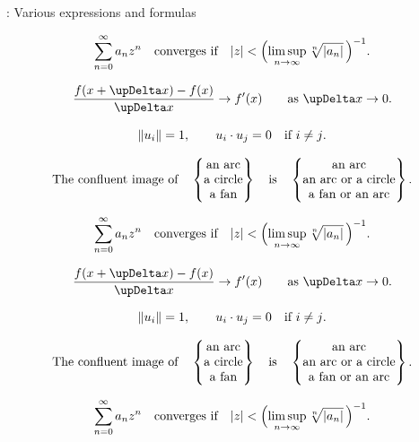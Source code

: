 \documentclass[aspectratio = 169, t, 10pt]{beamer}
\makeatletter
\let \rmfamilyorig \rmfamily%
\renewcommand*{\rmfamily}{%
		\edef\MT@currseries{\f@series}%
		\edef\MT@currshape{\f@shape}%
		\MTversion{serif}%
		\rmfamilyorig%
		\fontseries{\MT@currseries}%
		\fontshape{\MT@currshape}%
		\selectfont%
		\renewcommand{\boldmath}{\MTversion{boldserif}}%
	}%
\makeatother
\begin{document}
\begin{frame}[allowframebreaks]{\insertsection: Various expressions and formulas}
\framebreak

$$\sum_{n=0}^\infty a_nz^n\quad\hbox{converges if}\quad
|z|<\Bigl(\limsup_{n\to\infty}\root n\of{|a_n|}\,\Bigr)^{-1}.$$

$$\frac{f(x+\upDelta x)-f(x)}{\upDelta x}\to f'(x)
\qquad \hbox{as $\upDelta x\to0$.}$$

$$\|u_i\|=1,\qquad u_i\cdot u_j=0\quad\hbox{if $i\ne j$.}$$


$$\hbox{The confluent image of}\quad
\begin{Bmatrix}
	\hfill\hbox{an arc}\hfill\\
	\hfill\hbox{a circle}\hfill\\
	\hfill\hbox{a fan}\hfill\\
\end{Bmatrix}
\quad\hbox{is}\quad
\begin{Bmatrix}
	\hfill\hbox{an arc}\hfill\\
	\hfill\hbox{an arc or a circle}\hfill\\
	\hfill\hbox{a fan or an arc}\hfill
\end{Bmatrix}.$$

\framebreak

\begingroup
{}\bfseries
$$\sum_{n=0}^\infty a_nz^n\quad\hbox{converges if}\quad
|z|<\Bigl(\limsup_{n\to\infty}\root n\of{|a_n|}\,\Bigr)^{-1}.$$

$$\frac{f(x+\upDelta x)-f(x)}{\upDelta x}\to f'(x)
\qquad \hbox{as $\upDelta x\to0$.}$$

$$\|u_i\|=1,\qquad u_i\cdot u_j=0\quad\hbox{if $i\ne j$.}$$


$$\hbox{The confluent image of}\quad
\begin{Bmatrix}
	\hfill\hbox{an arc}\hfill\\
	\hfill\hbox{a circle}\hfill\\
	\hfill\hbox{a fan}\hfill\\
\end{Bmatrix}
\quad\hbox{is}\quad
\begin{Bmatrix}
	\hfill\hbox{an arc}\hfill\\
	\hfill\hbox{an arc or a circle}\hfill\\
	\hfill\hbox{a fan or an arc}\hfill
\end{Bmatrix}.$$
\endgroup

\framebreak

\begingroup
\rmfamily\bfseries{}
$$\sum_{n=0}^\infty a_nz^n\quad\hbox{converges if}\quad
|z|<\Bigl(\limsup_{n\to\infty}\root n\of{|a_n|}\,\Bigr)^{-1}.$$


\end{frame}
\end{document}
